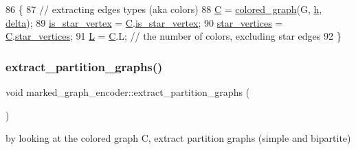 \begin{DoxyCode}
86 \{
87   \textcolor{comment}{// extracting edges types (aka colors)}
88   \hyperlink{classmarked__graph__encoder_af82bc0653414091291cb75553a407bdb}{C} = \hyperlink{classcolored__graph}{colored\_graph}(G, \hyperlink{classmarked__graph__encoder_ae7f8872c57d2d64e4ca6cc47387b9b58}{h}, \hyperlink{classmarked__graph__encoder_a29dcf42526b12cf7964a556bb1025c9b}{delta});
89   \hyperlink{classmarked__graph__encoder_a4ce8d85a7b63aed1272ec9824710ce45}{is\_star\_vertex} = \hyperlink{classmarked__graph__encoder_af82bc0653414091291cb75553a407bdb}{C}.\hyperlink{classcolored__graph_ad41163e970530c7e45878d299f0dc961}{is\_star\_vertex};
90   \hyperlink{classmarked__graph__encoder_a08fdf6fcd7dcd8c5d1667f2d7ff06c2c}{star\_vertices} = \hyperlink{classmarked__graph__encoder_af82bc0653414091291cb75553a407bdb}{C}.\hyperlink{classcolored__graph_ab7ee8d717abde7ad7467ef695038f574}{star\_vertices};
91   \hyperlink{classmarked__graph__encoder_a0f2e2dd184fe262f6fc93f375215227e}{L} = \hyperlink{classmarked__graph__encoder_af82bc0653414091291cb75553a407bdb}{C}.L; \textcolor{comment}{// the number of colors, excluding star edges }
92 \}
\end{DoxyCode}
\mbox{\label{classmarked__graph__encoder_a60b0038c57bd8fa2f5cb3f0b6999c4f3}} 
\subsubsection{\texorpdfstring{extract\+\_\+partition\+\_\+graphs()}{extract\_partition\_graphs()}}
{\footnotesize\ttfamily void marked\+\_\+graph\+\_\+encoder\+::extract\+\_\+partition\+\_\+graphs (\begin{DoxyParamCaption}{ }\end{DoxyParamCaption})\hspace{0.3cm}{\ttfamily [private]}}



by looking at the colored graph C, extract partition graphs (simple and bipartite) 


